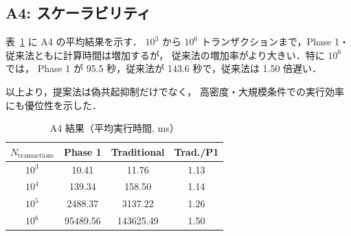 \subsection{A4: スケーラビリティ}
\label{sec:exp_a4}

表~\ref{tab:a4_summary} に A4 の平均結果を示す．
$10^3$ から $10^6$ トランザクションまで，Phase 1・従来法ともに計算時間は増加するが，
従来法の増加率がより大きい．特に $10^6$ では，
Phase 1 が 95.5 秒，従来法が 143.6 秒で，従来法は 1.50 倍遅い．

以上より，提案法は偽共起抑制だけでなく，
高密度・大規模条件での実行効率にも優位性を示した．

\begin{table}[t]
\caption{A4 結果（平均実行時間, ms）}
\label{tab:a4_summary}
\centering
\begin{tabular}{cccc}
\toprule
$N_{\text{transactions}}$ & Phase 1 & Traditional & Trad./P1 \\
\midrule
$10^3$ & 10.41 & 11.76 & 1.13 \\
$10^4$ & 139.34 & 158.50 & 1.14 \\
$10^5$ & 2488.37 & 3137.22 & 1.26 \\
$10^6$ & 95489.56 & 143625.49 & 1.50 \\
\bottomrule
\end{tabular}
\end{table}
